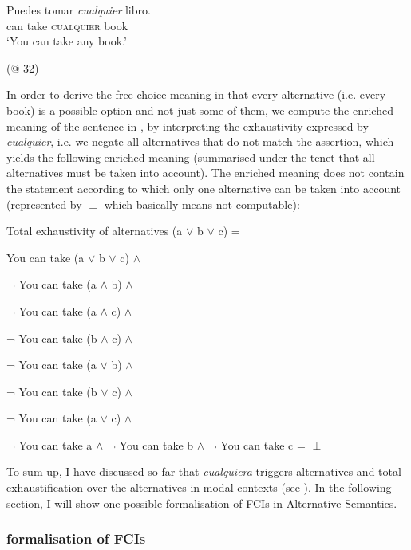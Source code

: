 \ea %
\label{bkm:Ref533761676}  
\gll Puedes tomar \textit{cualquier} libro.\\
can take \textsc{cualquier} book\\
  \glt ‘You can take any book.’

  (@ 32)
\z

In order to derive the free choice meaning in  that every alternative (i.e. every book) is a possible option and not just some of them, we compute the enriched meaning of the sentence in , by interpreting the exhaustivity expressed by \textit{cualquier}, i.e. we negate all alternatives that do not match the assertion, which yields the following enriched meaning (summarised under the tenet that all alternatives must be taken into account). The enriched meaning does not contain the statement according to which only one alternative can be taken into account (represented by ${\perp}$ which basically means not-computable):

\ea  %
\label{bkm:Ref533761693}  Total exhaustivity of alternatives (a ${\vee}$ b ${\vee}$ c) =

    You can take (a ${\vee}$ b ${\vee}$ c) ${\wedge}$

    ¬ You can take (a ${\wedge}$ b) ${\wedge}$

    ¬ You can take (a ${\wedge}$ c) ${\wedge}$

    ¬ You can take (b ${\wedge}$ c) ${\wedge}$

    ¬ You can take (a ${\vee}$ b) ${\wedge}$

    ¬ You can take (b ${\vee}$ c) ${\wedge}$

    ¬ You can take (a ${\vee}$ c) ${\wedge}$

    ¬ You can take a ${\wedge}$ ¬ You can take b ${\wedge}$ ¬ You can take c = ${\perp}$
\z

To sum up, I have discussed so far that \textit{cualquiera} triggers alternatives and total exhaustification over the alternatives in modal contexts (see ). In the following section, I will show one possible formalisation of FCIs in Alternative Semantics.

\subsubsection{{ formalisation of FCIs}} \label{sec:2.2.2.2}

